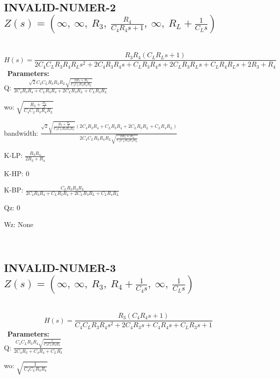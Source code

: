 \documentclass{article}
\begin{document}
\ 

\subsection{INVALID-NUMER-2 $Z(s) = \left( \infty, \  \infty, \  R_{3}, \  \frac{R_{4}}{C_{4} R_{4} s + 1}, \  \infty, \  R_{L} + \frac{1}{C_{L} s}\right)$ } \ 
\textbf{\[H(s) = \frac{R_{3} R_{4} \left(C_{L} R_{L} s + 1\right)}{2 C_{4} C_{L} R_{3} R_{4} R_{L} s^{2} + 2 C_{4} R_{3} R_{4} s + C_{L} R_{3} R_{4} s + 2 C_{L} R_{3} R_{L} s + C_{L} R_{4} R_{L} s + 2 R_{3} + R_{4}}\] } \ 
\textbf{Parameters:}\\ 

Q: $\frac{\sqrt{2} C_{4} C_{L} R_{3} R_{4} R_{L} \sqrt{\frac{2 R_{3} + R_{4}}{C_{4} C_{L} R_{3} R_{4} R_{L}}}}{2 C_{4} R_{3} R_{4} + C_{L} R_{3} R_{4} + 2 C_{L} R_{3} R_{L} + C_{L} R_{4} R_{L}}$\ 

wo: $\sqrt{\frac{R_{3} + \frac{R_{4}}{2}}{C_{4} C_{L} R_{3} R_{4} R_{L}}}$\ 

bandwidth: $\frac{\sqrt{2} \sqrt{\frac{R_{3} + \frac{R_{4}}{2}}{C_{4} C_{L} R_{3} R_{4} R_{L}}} \left(2 C_{4} R_{3} R_{4} + C_{L} R_{3} R_{4} + 2 C_{L} R_{3} R_{L} + C_{L} R_{4} R_{L}\right)}{2 C_{4} C_{L} R_{3} R_{4} R_{L} \sqrt{\frac{2 R_{3} + R_{4}}{C_{4} C_{L} R_{3} R_{4} R_{L}}}}$\ 

K-LP: $\frac{R_{3} R_{4}}{2 R_{3} + R_{4}}$\ 

K-HP: $0$\ 

K-BP: $\frac{C_{L} R_{3} R_{4} R_{L}}{2 C_{4} R_{3} R_{4} + C_{L} R_{3} R_{4} + 2 C_{L} R_{3} R_{L} + C_{L} R_{4} R_{L}}$\ 

Qz: $0$\ 

Wz: $\text{None}$\ 

\ 

\subsection{INVALID-NUMER-3 $Z(s) = \left( \infty, \  \infty, \  R_{3}, \  R_{4} + \frac{1}{C_{4} s}, \  \infty, \  \frac{1}{C_{L} s}\right)$ } \ 
\textbf{\[H(s) = \frac{R_{3} \left(C_{4} R_{4} s + 1\right)}{C_{4} C_{L} R_{3} R_{4} s^{2} + 2 C_{4} R_{3} s + C_{4} R_{4} s + C_{L} R_{3} s + 1}\] } \ 
\textbf{Parameters:}\\ 

Q: $\frac{C_{4} C_{L} R_{3} R_{4} \sqrt{\frac{1}{C_{4} C_{L} R_{3} R_{4}}}}{2 C_{4} R_{3} + C_{4} R_{4} + C_{L} R_{3}}$\ 

wo: $\sqrt{\frac{1}{C_{4} C_{L} R_{3} R_{4}}}$\ 
\end{document}
